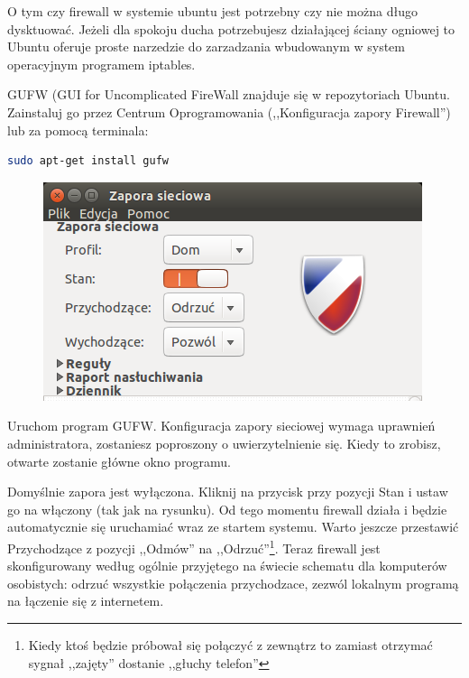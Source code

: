 O tym czy firewall w systemie ubuntu jest potrzebny czy nie można długo dysktuować. Jeżeli dla spokoju ducha potrzebujesz działającej ściany ogniowej to Ubuntu oferuje proste narzedzie do zarzadzania wbudowanym w system operacyjnym programem iptables.

GUFW (\textcolor{ubuntu_orange}{GUI for Uncomplicated FireWall} znajduje się w repozytoriach Ubuntu. Zainstaluj go przez Centrum Oprogramowania (,,Konfiguracja zapory Firewall'') lub za pomocą terminala:
\begin{lstlisting}[language=bash]
sudo apt-get install gufw
\end{lstlisting}

\begin{figure}
	\vspace{-10pt}
	\includegraphics[width=\linewidth]{images/programy_gufw.png}
\end{figure}

Uruchom program GUFW. Konfiguracja zapory sieciowej wymaga uprawnień administratora, zostaniesz poproszony o uwierzytelnienie się. Kiedy to zrobisz, otwarte zostanie główne okno programu.

Domyślnie zapora jest wyłączona. Kliknij na przycisk przy pozycji \textcolor{ubuntu_orange}{Stan} i ustaw go na włączony (tak jak na rysunku). Od tego momentu firewall działa i będzie automatycznie się uruchamiać wraz ze startem systemu. Warto jeszcze przestawić \textcolor{ubuntu_orange}{Przychodzące} z pozycji ,,Odmów'' na ,,Odrzuć''\footnote{Kiedy ktoś będzie próbował się połączyć z zewnątrz to zamiast otrzymać sygnał ,,zajęty'' dostanie ,,głuchy telefon''}. Teraz firewall jest skonfigurowany według ogólnie przyjętego na świecie schematu dla komputerów osobistych: odrzuć wszystkie połączenia przychodzace, zezwól lokalnym programą na łączenie się z internetem.


